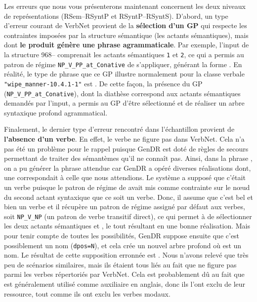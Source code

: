 Les erreurs que nous vous présenterons maintenant concernent les deux niveaux de représentations (\ac{RSem}--\ac{RSyntP} et \ac{RSyntP}--\ac{RSyntS}). D'abord, un type d'erreur courant de VerbNet provient de la \textbf{sélection d'un \ac{GP}} qui respecte les contraintes imposées par la structure sémantique (les actants sémantiques), mais dont \textbf{le produit génère une phrase agrammaticale}. Par exemple, l'input de la structure 968-- comprenait les actants sémantiques \texttt{1} et \texttt{2}, ce qui a permis au patron de régime \texttt{NP\_V\_PP\_at\_Conative} de s'appliquer, générant la forme \ungr{}. En réalité, le type de phrase que ce \ac{GP} illustre normalement pour la classe verbale \texttt{"wipe\_manner-10.4.1-1"} est . De cette façon, la présence du \ac{GP} (\texttt{NP\_V\_PP\_at\_Conative}), dont la diathèse correspond aux actants sémantiques demandés par l'input, a permis au \ac{GP} d'être sélectionné et de réaliser un arbre syntaxique profond agrammatical.

Finalement, le dernier type d'erreur rencontré dans l'échantillon provient de \textbf{l'absence d'un verbe}. En effet, le verbe  ne figure pas dans VerbNet. Cela n'a pas été un problème pour le rappel puisque GenDR est doté de règles de secours permettant de traiter des sémantèmes qu'il ne connaît pas. Ainsi, dans la phrase , on a pu générer la phrase attendue car GenDR a opéré diverses réalisations dont, une correspondait à celle que nous attendions. Le système a supposé que c'était un verbe puisque le patron de régime de  avait mis comme contrainte sur le n\oe{}ud du second actant syntaxique que ce soit un verbe. Donc, il assume que c'est bel et bien un verbe et il récupère un patron de régime assigné par défaut aux verbes, soit \texttt{NP\_V\_NP} (un patron de verbe transitif direct), ce qui permet à  de sélectionner les deux actants sémantiques  et , le tout résultant en une bonne réalisation. Mais pour tenir compte de toutes les possibilités, GenDR suppose ensuite que c'est possiblement un nom (\texttt{dpos=N}), et cela crée un nouvel arbre profond où  est un nom. Le résultat de cette supposition erronnée est \ungr{}. Nous n'avons relevé que très peu de scénarios similaires, mais ils étaient tous liés au fait que  ne figure pas parmi les verbes répertoriés par VerbNet. Cela est probablement dû au fait que  est généralement utilisé comme auxiliaire en anglais, donc ils l'ont exclu de leur ressource, tout comme ils ont exclu les verbes modaux.

